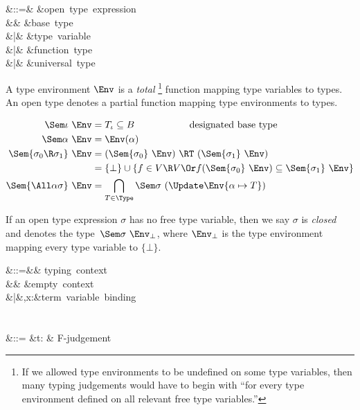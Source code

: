 \documentclass{amsart}
\begin{document}
\label{open-types}

\begin{syntax}
\sigma &::=& &\mbox{open type expression}\\
&& \iota &\mbox{base type}\\
&|& \alpha &\mbox{type variable}\\
&|& \sigma\R\sigma &\mbox{function type}\\
&|& \All\alpha\sigma &\mbox{universal type}
\end{syntax}%

\label{interp-open-types}

A type environment $\Env$ is a \emph{total}%
%
\footnote{%
If we allowed type environments to be undefined on some type
variables, then many typing judgements would have to begin with
``for every type environment defined on all relevant free type
variables.''
%
} %
function mapping type variables to types.
An open type denotes a partial function mapping type environments
to types.

\begin{align*}
\Sem\iota~\Env &= T_\iota \subseteq B\hspace{2cm}\mbox{designated base type}\\
\Sem\alpha~\Env &= \Env(\alpha)\\
\Sem{\sigma_0\R\sigma_1}~\Env &= (\Sem{\sigma_0}~\Env)\ \RT\ (\Sem{\sigma_1}~\Env)\\
&=\{\bot\}\cup\{f\in V\R V\Or f(\Sem{\sigma_0}~\Env)\subseteq\Sem{\sigma_1}~\Env\}\\
\Sem{\All\alpha\sigma}~\Env &=
\bigcap_{T\in\Type} \Sem\sigma~(\Update\Env{\alpha\mapsto T})
\end{align*}

If an open type expression $\sigma$ has no free type variable,
then we say $\sigma$ is \emph{closed} and denotes the
type~$\Sem\sigma~\Env_\bot$, where $\Env_\bot$ is the type
environment mapping every type variable to $\{\bot\}$.



\begin{syntax}
\Gamma &::=&& \mbox{typing context}\\
&& \emptyset &\mbox{empty context}\\
&|&\Gamma,x:\sigma &\mbox{term variable binding}\\
\\\\
\JF &::=
&\Gamma\vdash t:\sigma
& \mbox{F-judgement}
\end{syntax}
\end{document}
